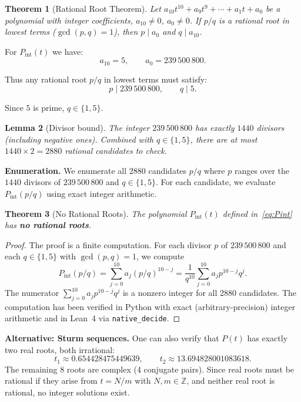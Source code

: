 \documentclass[12pt,a4paper]{article}
\theoremstyle{plain}
\newtheorem{theorem}{Theorem}[section]
\newtheorem{lemma}[theorem]{Lemma}
\theoremstyle{definition}
\newcommand{\Z}{\mathbb{Z}}
\begin{document}
\begin{theorem}[Rational Root Theorem]
  Let $a_{10} t^{10} + a_9 t^9 + \cdots + a_1 t + a_0$ be a polynomial
  with integer coefficients, $a_{10} \neq 0$, $a_0 \neq 0$.
  If $p/q$ is a rational root in lowest terms ($\gcd(p,q) = 1$),
  then $p \mid a_0$ and $q \mid a_{10}$.
\end{theorem}

For $P_{\mathrm{int}}(t)$ we have:
\[
  a_{10} = 5, \qquad a_0 = 239\,500\,800.
\]

Thus any rational root $p/q$ in lowest terms must satisfy:
\[
  p \mid 239\,500\,800, \qquad q \mid 5.
\]

Since $5$ is prime, $q \in \{1, 5\}$.

\begin{lemma}[Divisor bound]
  The integer $239\,500\,800$ has exactly $1440$ divisors (including
  negative ones).  Combined with $q \in \{1,5\}$, there are at most
  $1440 \times 2 = 2880$ rational candidates to check.
\end{lemma}

\textbf{Enumeration.}  We enumerate all $2880$ candidates
$p/q$ where $p$ ranges over the $1440$ divisors of $239\,500\,800$
and $q \in \{1,5\}$.  For each candidate, we evaluate
$P_{\mathrm{int}}(p/q)$ using exact integer arithmetic.

\begin{theorem}[No Rational Roots]\label{thm:no-rational-roots}
  The polynomial $P_{\mathrm{int}}(t)$ defined in~\eqref{eq:Pint}
  has \textbf{no rational roots}.
\end{theorem}

\begin{proof}
  The proof is a finite computation.  For each divisor $p$ of
  $239\,500\,800$ and each $q \in \{1,5\}$ with $\gcd(p,q)=1$,
  we compute
  \[
    P_{\mathrm{int}}(p/q) = \sum_{j=0}^{10} a_j (p/q)^{10-j}
    = \frac{1}{q^{10}} \sum_{j=0}^{10} a_j p^{10-j} q^{j}.
  \]
  The numerator $\sum_{j=0}^{10} a_j p^{10-j} q^{j}$ is a nonzero
  integer for all 2880 candidates.  The computation has been verified
  in Python with exact (arbitrary-precision) integer arithmetic and
  in Lean~4 via \texttt{native\_decide}.
\end{proof}

\textbf{Alternative: Sturm sequences.}  One can also verify that
$P(t)$ has exactly two real roots, both irrational:
\[
  t_1 \approx 0.654428475449639, \qquad
  t_2 \approx 13.694828001083618.
\]
The remaining 8 roots are complex (4 conjugate pairs).
Since real roots must be rational if they arise from
$t = N/m$ with $N,m \in \Z$, and neither real root is rational,
no integer solutions exist.
\end{document}
